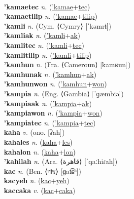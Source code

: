  \label{'kamaeak} \\
\textbf{'kamaetec} \textit{n.} (\hyperref['kamae]{'kamae}+\hyperref[tec]{tec})
 \label{'kamaetec} \\
\textbf{'kamaetilip} \textit{n.} (\hyperref['kamae]{'kamae}+\hyperref[tilip]{tilip})
 \label{'kamaetilip} \\
\textbf{'kamli} \textit{n.} (Cym. ⟨Cymry⟩ [ˈkəmrɨ])
 \label{'kamli} \\
\textbf{'kamliak} \textit{n.} (\hyperref['kamli]{'kamli}+\hyperref[ak]{ak})
 \label{'kamliak} \\
\textbf{'kamlitec} \textit{n.} (\hyperref['kamli]{'kamli}+\hyperref[tec]{tec})
 \label{'kamlitec} \\
\textbf{'kamlitilip} \textit{n.} (\hyperref['kamli]{'kamli}+\hyperref[tilip]{tilip})
 \label{'kamlitilip} \\
\textbf{'kamhun} \textit{n.} (Fra. ⟨Cameroun⟩ [kamʁun])
 \label{'kamhun} \\
\textbf{'kamhunak} \textit{n.} (\hyperref['kamhun]{'kamhun}+\hyperref[ak]{ak})
 \label{'kamhunak} \\
\textbf{'kamhunwon} \textit{n.} (\hyperref['kamhun]{'kamhun}+\hyperref[won]{won})
 \label{'kamhunwon} \\
\textbf{'kampia} \textit{n.} (Eng. ⟨Gambia⟩ [ˈɡæmbiə])
 \label{'kampia} \\
\textbf{'kampiaak} \textit{n.} (\hyperref['kampia]{'kampia}+\hyperref[ak]{ak})
 \label{'kampiaak} \\
\textbf{'kampiawon} \textit{n.} (\hyperref['kampia]{'kampia}+\hyperref[won]{won})
 \label{'kampiawon} \\
\textbf{'kampiatec} \textit{n.} (\hyperref['kampia]{'kampia}+\hyperref[tec]{tec})
 \label{'kampiatec} \\
\textbf{kaha} \textit{v.} (ono. [ʡah])
 \label{kaha} \\
\textbf{kahales} \textit{n.} (\hyperref[kaha]{kaha}+\hyperref[les]{les})
 \label{kahales} \\
\textbf{kahalon} \textit{n.} (\hyperref[kaha]{kaha}+\hyperref[lon]{lon})
 \label{kahalon} \\
\textbf{'kahilah} \textit{n.} (Ara. ⟨قاهرة⟩ [ˈqaːhiɾah])
 \label{'kahilah} \\
\textbf{kac} \textit{n.} (Ben. ⟨গাছ⟩ [ɡat͡ɕʰ])
 \label{kac} \\
\textbf{kacyeh} \textit{n.} (\hyperref[kac]{kac}+\hyperref[yeh]{yeh})
 \label{kacyeh} \\
\textbf{kaccaka} \textit{v.} (\hyperref[kac]{kac}+\hyperref[caka]{caka})
